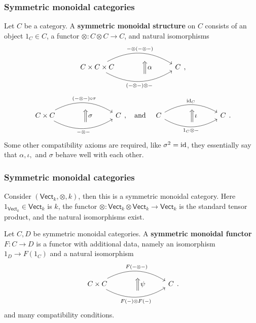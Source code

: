 \documentclass[xcolor=dvipsnames]{beamer}
\begin{document}
        \begingroup
        \small
    \begin{frame}[fragile]
        \frametitle{Symmetric monoidal categories} 
        \begin{definition}
            Let $C$ be a category. A \textbf{symmetric monoidal structure} on $C$ consists of an object $1_C \in C$, a functor $\otimes \colon C\otimes C \to C$, and natural isomorphisms\[ 
    \begin{tikzcd}
        C\times C\times C\arrow[rr, "-\otimes(-\otimes -)", bend left] \arrow[rr, "(-\otimes -)\otimes -"', bend right] & \,\,~ \Big\Uparrow\alpha  & C
\end{tikzcd},
    \] \[
        \begin{tikzcd}
        C\times C\arrow[rr, "(-\otimes -)\circ \tau", bend left] \arrow[rr, "-\otimes -"', bend right] & \,\,~ \Big\Uparrow\sigma  & C
\end{tikzcd}, \quad \text{and} \quad
        \begin{tikzcd}
        C\arrow[rr, "\id_C", bend left] \arrow[rr, "1_C \otimes -"', bend right] & \,\,~ \Big\Uparrow\iota  & C
\end{tikzcd}.
    \]
           Some other compatibility axioms are required, like $\sigma^2=\operatorname{id}$, they essentially say that $\alpha ,\iota,$ and $\sigma$ behave well with each other. 
        \end{definition}
    \end{frame}

    \begin{frame}[fragile]
        \frametitle{Symmetric monoidal categories} 
        \begin{example}
            Consider $(\mathsf{Vect} _k,\otimes, k)$, then this is a symmetric monoidal category. Here $1_{\mathsf{Vect} _k}\in \mathsf{Vect} _k$ is $k$, the functor $\otimes \colon \mathsf{Vect} _k \otimes \mathsf{Vect} _k\to \mathsf{Vect} _k$ is the standard tensor product, and the natural isomorphisms exist.
        \end{example}
        \begin{definition}
            Let $C,D$ be symmetric monoidal categories. A \textbf{symmetric monoidal functor} $F \colon C \to D$ is a functor with additional data, namely an isomorphism $1_D \to F(1_C)$ and a natural isomorphism \[
                   \begin{tikzcd}
            C\times C\arrow[rr, "F(-\otimes -)", bend left] \arrow[rr, "F(-)\otimes F(-)"', bend right] & \,\,~ \Big\Uparrow\psi  & C
\end{tikzcd}.
            \] and many compatibility conditions.
        \end{definition}
    \end{frame}
    \endgroup
\end{document}

